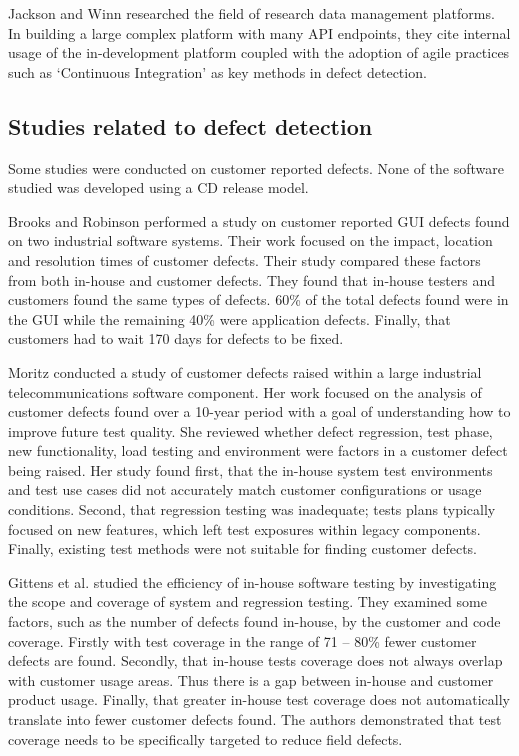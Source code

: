Jackson and Winn \cite{jackson2012eating} researched the field of research data management platforms. In building a large complex platform with many API endpoints, they cite internal usage of the in-development platform coupled with the adoption of agile practices such as `Continuous Integration'\cite{wikiCI} as key methods in defect detection.

\subsection{Studies related to defect detection}
Some studies were conducted on customer reported defects. None of the software studied was developed using a CD  release model. \par

Brooks and Robinson \cite{brooks2009initial} performed a study on customer reported GUI defects found on two industrial software systems. Their work focused on the impact, location and resolution times of customer defects. Their study compared these factors from both in-house and customer defects. They found that in-house testers and customers found the same types of defects. 60\% of the total defects found were in the GUI while the remaining 40\% were application defects. Finally, that customers had to wait 170 days for defects to be fixed. \par

Moritz \cite{moritz2009case} conducted a study of customer defects raised within a large industrial telecommunications software component. Her work focused on the analysis of customer defects found over a 10-year period with a goal of understanding how to improve future test quality. She reviewed whether defect regression, test phase, new functionality, load testing and environment were factors in a customer defect being raised. Her study found first, that the in-house system test environments and test use cases did not accurately match customer configurations or usage conditions. Second, that regression testing was inadequate; tests plans typically focused on new features,  which left test exposures within legacy components. Finally, existing test methods were not suitable for finding customer defects. \par

 Gittens et al. \cite{gittens2002empirical} studied the efficiency of in-house software testing by investigating the scope and coverage of system and regression testing. They examined some factors, such as the number of defects found in-house, by the customer and code coverage. Firstly with test coverage in the range of 71 -- 80\% fewer customer defects are found. Secondly, that in-house tests coverage does not always overlap with customer usage areas. Thus there is a gap between in-house and customer product usage. Finally, that greater in-house test coverage does not automatically translate into fewer customer defects found. The authors demonstrated that test coverage needs to be specifically targeted to reduce field defects. \par
 
